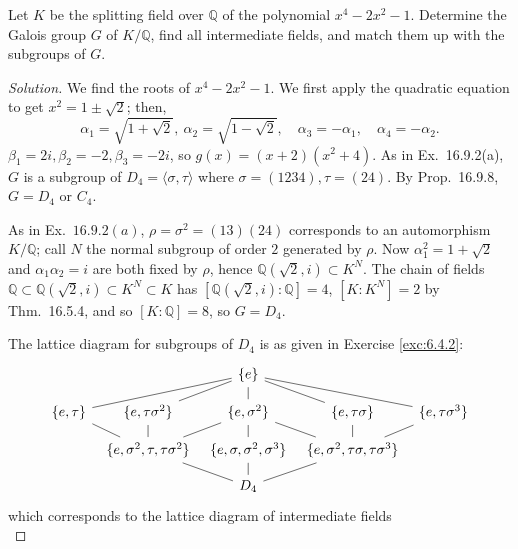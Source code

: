 \documentclass[12pt]{article}
\theoremstyle{remark}
\begin{document}
\setcounter{subsubsection}{12}
\begin{problem}
  Let $K$ be the splitting field over $\mathbb{Q}$ of the polynomial $x^4 - 2x^2 - 1$. Determine the Galois group $G$ of $K/\mathbb{Q}$, find all intermediate fields, and match them up with the subgroups of $G$.
\end{problem}
\begin{proof}[Solution]
  We find the roots of $x^4-2x^2-1$. We first apply the quadratic equation to get $x^2 = 1\pm\sqrt{2}$; then,
  \begin{equation*}
    \alpha_1 = \sqrt{1+\sqrt{2}}, ~ \alpha_2 = \sqrt{1-\sqrt{2}}, \quad \alpha_3 = -\alpha_1, \quad \alpha_4 = -\alpha_2.
  \end{equation*}
  $\beta_1 = 2i,\beta_2 = -2,\beta_3 = -2i$, so $g(x) = (x+2)(x^2+4)$. As in Ex.~16.9.2(a), $G$ is a subgroup of $D_4 = \langle \sigma,\tau \rangle$ where $\sigma = (1234),\tau=(24)$. By Prop.~16.9.8, $G = D_4$ or $C_4$.
  \par As in Ex.~$16.9.2(a)$, $\rho = \sigma^2 = (13)(24)$ corresponds to an automorphism $K/\mathbb{Q}$; call $N$ the normal subgroup of order $2$ generated by $\rho$. Now $\alpha_1^2 = 1+\sqrt{2}$ and $\alpha_1\alpha_2 = i$ are both fixed by $\rho$, hence $\mathbb{Q}(\sqrt{2},i) \subset K^N$. The chain of fields $\mathbb{Q} \subset \mathbb{Q}(\sqrt{2},i) \subset K^N \subset K$ has $[\mathbb{Q}(\sqrt{2},i):\mathbb{Q}] = 4$, $[K:K^N] = 2$ by Thm.~16.5.4, and so $[K:\mathbb{Q}] = 8$, so $G = D_4$.
  \par The lattice diagram for subgroups of $D_4$ is as given in Exercise \ref{exc:6.4.2}:
  \begin{equation*}
    \begin{tikzcd}[column sep=tiny,row sep=small]
      {} & & \{e\}\arrow[dash]{dll}\arrow[dash]{dl}\arrow[dash]{d}\arrow[dash]{dr}\arrow[dash]{drr}\\
      \{e,\tau\} & \{e,\tau\sigma^2\} & \{e,\sigma^2\} & \{e,\tau\sigma\} & \{e,\tau\sigma^3\}\\
      & \{e,\sigma^2,\tau,\tau\sigma^2\}\ar[dash]{ul}\ar[dash]{u}\ar[dash]{ur} & \{e,\sigma,\sigma^2,\sigma^3\}\ar[dash]{u} & \{e,\sigma^2,\tau\sigma,\tau\sigma^3\}\ar[dash]{ul}\ar[dash]{u}\ar[dash]{ur}\\
      & & D_4\ar[dash]{ul}\ar[dash]{u}\ar[dash]{ur}
    \end{tikzcd}
  \end{equation*}
  which corresponds to the lattice diagram of intermediate fields
  \begin{equation*}

\end{equation*}
\end{proof}
\end{document}
